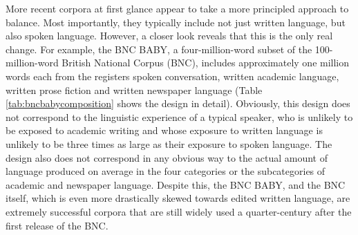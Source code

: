 More recent corpora at first glance appear to take a more principled approach to balance. Most importantly, they typically include not just written language, but also spoken language. However, a closer look reveals that this is the only real change. For example, the BNC BABY, a four-million-word subset of the 100-million-word British National Corpus (BNC), includes approximately one million words each from the registers spoken conversation, written academic language, written prose fiction and written newspaper language (Table \ref{tab:bncbabycomposition} shows the design in detail). Obviously, this design does not correspond to the linguistic experience of a typical speaker, who is unlikely to be exposed to academic writing and whose exposure to written language is unlikely to be three times as large as their exposure to spoken language. The design also does not correspond in any obvious way to the actual amount of language produced on average in the four categories or the subcategories of academic and newspaper language. Despite this, the BNC BABY, and the BNC itself, which is even more drastically skewed towards edited written language, are extremely successful corpora that are still widely used a quarter-century after the first release of the BNC.

